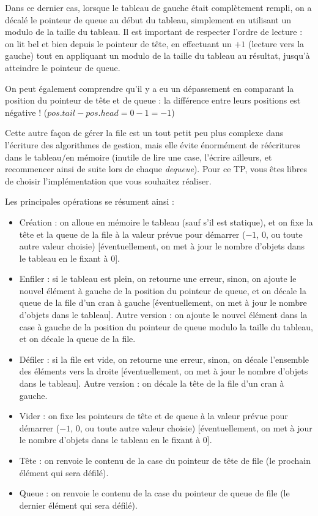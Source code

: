 \smallskip

Dans ce dernier cas, lorsque le tableau de gauche était complètement rempli, on a décalé le pointeur de queue au début du tableau, simplement en utilisant un modulo de la taille du tableau.
Il est important de respecter l'ordre de lecture : on lit bel et bien depuis le pointeur de tête, en effectuant un $ +1 $ (lecture vers la gauche) tout en appliquant un modulo de la taille du tableau au résultat, jusqu'à atteindre le pointeur de queue.

On peut également comprendre qu'il y a eu un dépassement en comparant la position du pointeur de tête et de queue : la différence entre leurs positions est négative ! \linebreak
($ pos. tail - pos. head = 0 - 1 = -1$)

\bigskip

Cette autre façon de gérer la file est un tout petit peu plus complexe dans l'écriture des algorithmes de gestion, mais elle évite énormément de réécritures dans le tableau/en mémoire (inutile de lire une case, l'écrire ailleurs, et recommencer ainsi de suite lors de chaque \textit{dequeue}).
Pour ce TP, vous êtes libres de choisir l'implémentation que vous souhaitez réaliser.

\bigskip

Les principales opérations se résument ainsi :
\begin{itemize}
\item Création : on alloue en mémoire le tableau (sauf s'il est statique), et on fixe la tête et la queue de la file à la valeur prévue pour démarrer ($ -1 $, $ 0 $, ou toute autre valeur choisie) [éventuellement, on met à jour le nombre d'objets dans le tableau en le fixant à $ 0 $].
\item Enfiler : si le tableau est plein, on retourne une erreur, sinon, on ajoute le nouvel élément à gauche de la position du pointeur de queue, et on décale la queue de la file d'un cran à gauche [éventuellement, on met à jour le nombre d'objets dans le tableau].
Autre version : on ajoute le nouvel élément dans la case à gauche de la position du pointeur de queue modulo la taille du tableau, et on décale la queue de la file.
\item Défiler : si la file est vide, on retourne une erreur, sinon, on décale l'ensemble des éléments vers la droite [éventuellement, on met à jour le nombre d'objets dans le tableau].
Autre version : on décale la tête de la file d'un cran à gauche.
\item Vider : on fixe les pointeurs de tête et de queue à la valeur prévue pour démarrer ($ -1 $, $ 0 $, ou toute autre valeur choisie) [éventuellement, on met à jour le nombre d'objets dans le tableau en le fixant à $ 0 $].
\item Tête : on renvoie le contenu de la case du pointeur de tête de file (le prochain élément qui sera défilé).
\item Queue : on renvoie le contenu de la case du pointeur de queue de file (le dernier élément qui sera défilé).
\end{itemize}


\setlength{\parindent}{\defaultparindent}
